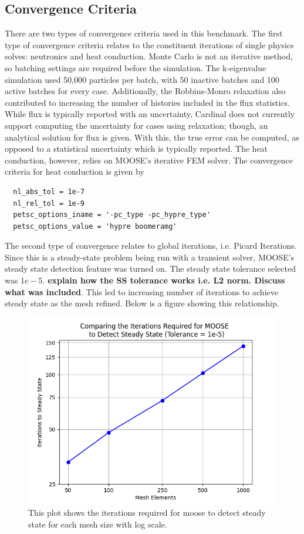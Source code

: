 \documentclass[letterpaper]{mc2023}
\begin{document}
\subsection{Convergence Criteria}
There are two types of convergence criteria used in this benchmark. The first type of convergence criteria relates to the
constituent iterations of single physics solves: neutronics and heat conduction. Monte Carlo is not an iterative method,
so batching settings are required before the simulation. The k-eigenvalue simulation used 50,000 particles per batch,
with 50 inactive batches and 100 active batches for every case. Additionally, the Robbins-Monro relaxation also contributed
to increasing the number of histories included in the flux statistics. While flux is typically reported with an uncertainty,
Cardinal does not currently support computing the uncertainty for cases using relaxation; though, an analytical solution for
flux is given. With this, the true error can be computed, as opposed to a statistical uncertainty which is typically reported.
The heat conduction, however, relies on MOOSE's iterative FEM solver. The convergence criteria for heat conduction is given by

\begin{lstlisting}
  nl_abs_tol = 1e-7
  nl_rel_tol = 1e-9
  petsc_options_iname = '-pc_type -pc_hypre_type'
  petsc_options_value = 'hypre boomeramg'
\end{lstlisting}
The second type of convergence relates to global iterations, i.e. Picard Iterations. Since this is a steady-state problem being
run with a transient solver, MOOSE's steady state detection feature was turned on. The steady state tolerance selected was $1e-5$.
\textbf{explain how the SS tolerance works i.e. L2 norm. Discuss what was included}. This led to increasing number of iterations
to achieve steady state as the mesh refined. Below is a figure showing this relationship.

\begin{figure}[H]
    \centering
    \includegraphics[width=0.5\linewidth]{figures/its_to_ss.png}
    \caption{This plot shows the iterations required for \gls{moose} to detect steady state for each mesh size with log scale.}
    \label{fig:its_to_ss}
\end{figure}
\end{document}
